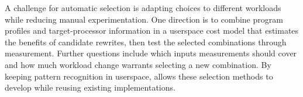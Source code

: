 A challenge for automatic selection is adapting choices to different workloads while reducing manual experimentation. One direction is to combine program profiles and target-processor information in a userspace cost model that estimates the benefits of candidate rewrites, then test the selected combinations through measurement. Further questions include which inputs measurements should cover and how much workload change warrants selecting a new combination. By keeping pattern recognition in userspace, \tool allows these selection methods to develop while reusing existing \kinsn implementations.
